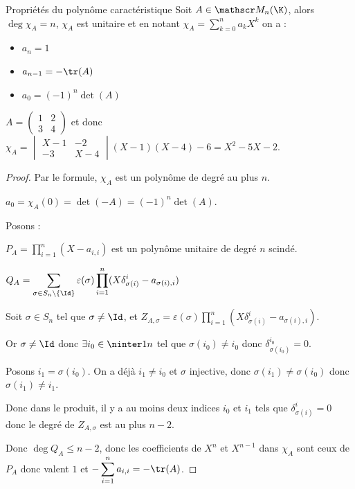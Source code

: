 \begin{theoreme}{Propriétés du polynôme caractéristique}{}
    Soit $A \in \mathscr M_n (\K)$, alors $\deg \chi_A = n$, $\chi_A$ est unitaire et en notant $\displaystyle \chi_A = \sum_{k = 0 }^{n } a_kX^k$ on a : 

    \begin{itemize}
        \item $a_n = 1$
        \item $a_{n - 1} = - \tr(A)$
        \item $a_0 = (-1)^n \det(A)$
    \end{itemize}
\end{theoreme}

\begin{exemple}
    $A = \begin{pmatrix}
        1 & 2 \\
        3 & 4
    \end{pmatrix}$ et donc $\chi_A = \begin{vmatrix}
        X - 1 & -2 \\
        -3 & X - 4
    \end{vmatrix} (X - 1)(X - 4) - 6 = X^2 - 5X - 2$.
\end{exemple}


\begin{proof}
    Par le formule, $\chi_A$ est un polynôme de degré au plus $n$.

    $a_0 = \chi_A(0) = \det(-A) = (-1)^n \det(A)$.

    \avspace Posons : 
    
    $\displaystyle P_A = \prod_{i = 1 }^{ n } (X - a_{i, i})$ est un polynôme unitaire de degré $n$ scindé.

    $\displaystyle Q_A = \sum_{\sigma \in S_n \setminus \{\Id\}} \varepsilon(\sigma) \prod_{i = 1 }^{ n } (X \delta_{\sigma(i)}^i - a_{\sigma(i), i})$ 

    Soit $\sigma \in S_n$ tel que $\sigma \neq \Id$, et 
    $\displaystyle Z_{A, \sigma} = \varepsilon(\sigma) \prod_{i = 1 }^{ n } (X \delta_{\sigma(i)}^i - a_{\sigma(i), i})$.

    Or $\sigma \neq \Id$ donc $\exists i_0 \in \ninter 1 n$ tel que $\sigma(i_0) \neq i_0$ donc $\delta_{\sigma(i_0)}^{i_0} = 0$.

    Posons $i_1 = \sigma(i_0)$. On a déjà $i_1 \neq i_0$ et $\sigma$ injective, donc $\sigma(i_1) \neq \sigma(i_0)$
    donc $\sigma(i_1) \neq i_1$. 

    Donc dans le produit, il y a au moins deux indices $i_0$ et $i_1$ tels que 
    $\delta_{\sigma(i)}^i = 0$ donc le degré de $Z_{A, \sigma}$ est au plus $n - 2$.

    Donc $\deg Q_A \leqslant n - 2$, donc les coefficients de $X^n$ et $X^{n - 1}$ dans $\chi_A$ 
    sont ceux de $P_A$ donc valent $1$ et $\displaystyle - \sum_{i = 1 }^{n } a_{i, i} = - \tr(A)$.
\end{proof}

